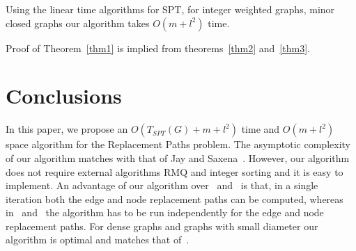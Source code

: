 \documentclass[11pt,a4paper]{llncs}
\begin{document}
Using the linear time algorithms for SPT, for integer weighted graphs,
minor closed graphs our algorithm takes $O(m + l^2)$ time.

Proof of Theorem~\ref{thm1} is implied from theorems~\ref{thm2} and~\ref{thm3}.


\section{Conclusions}
\label{conc}
In this paper, we propose an $O(T_{SPT}(G) + m + l^2)$ time  and $O(m + l^2)$
space algorithm for the Replacement Paths problem. The asymptotic complexity of our algorithm matches
with that of Jay and Saxena~\cite{jay}. However,
our algorithm does not require external algorithms RMQ and integer sorting and it is easy to implement.
An advantage of our algorithm over~\cite{jay} and~\cite{linearrsp} is that, in a single iteration
both the edge and node replacement paths can be computed, whereas in~\cite{jay} and~\cite{linearrsp}
the algorithm has to be run independently for the edge and node replacement paths.
For dense graphs and graphs with small diameter our algorithm is optimal and matches that of~\cite{linearrsp}.


\end{document}
